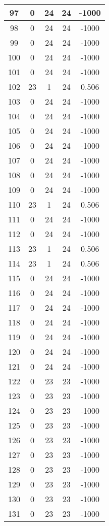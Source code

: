 \documentclass[letterpaper, 12pt]{article}
\begin{document}
\begin{longtable}{|c|c|c|c|c|}
\hline
97 & 0 & 24 & 24 & -1000 \\
\hline
98 & 0 & 24 & 24 & -1000 \\
\hline
99 & 0 & 24 & 24 & -1000 \\
\hline
100 & 0 & 24 & 24 & -1000 \\
\hline
101 & 0 & 24 & 24 & -1000 \\
\hline
102 & 23 & 1 & 24 & 0.506 \\
\hline
103 & 0 & 24 & 24 & -1000 \\
\hline
104 & 0 & 24 & 24 & -1000 \\
\hline
105 & 0 & 24 & 24 & -1000 \\
\hline
106 & 0 & 24 & 24 & -1000 \\
\hline
107 & 0 & 24 & 24 & -1000 \\
\hline
108 & 0 & 24 & 24 & -1000 \\
\hline
109 & 0 & 24 & 24 & -1000 \\
\hline
110 & 23 & 1 & 24 & 0.506 \\
\hline
111 & 0 & 24 & 24 & -1000 \\
\hline
112 & 0 & 24 & 24 & -1000 \\
\hline
113 & 23 & 1 & 24 & 0.506 \\
\hline
114 & 23 & 1 & 24 & 0.506 \\
\hline
115 & 0 & 24 & 24 & -1000 \\
\hline
116 & 0 & 24 & 24 & -1000 \\
\hline
117 & 0 & 24 & 24 & -1000 \\
\hline
118 & 0 & 24 & 24 & -1000 \\
\hline
119 & 0 & 24 & 24 & -1000 \\
\hline
120 & 0 & 24 & 24 & -1000 \\
\hline
121 & 0 & 24 & 24 & -1000 \\
\hline
122 & 0 & 23 & 23 & -1000 \\
\hline
123 & 0 & 23 & 23 & -1000 \\
\hline
124 & 0 & 23 & 23 & -1000 \\
\hline
125 & 0 & 23 & 23 & -1000 \\
\hline
126 & 0 & 23 & 23 & -1000 \\
\hline
127 & 0 & 23 & 23 & -1000 \\
\hline
128 & 0 & 23 & 23 & -1000 \\
\hline
129 & 0 & 23 & 23 & -1000 \\
\hline
130 & 0 & 23 & 23 & -1000 \\
\hline
131 & 0 & 23 & 23 & -1000 \\

\end{longtable}
\end{document}
